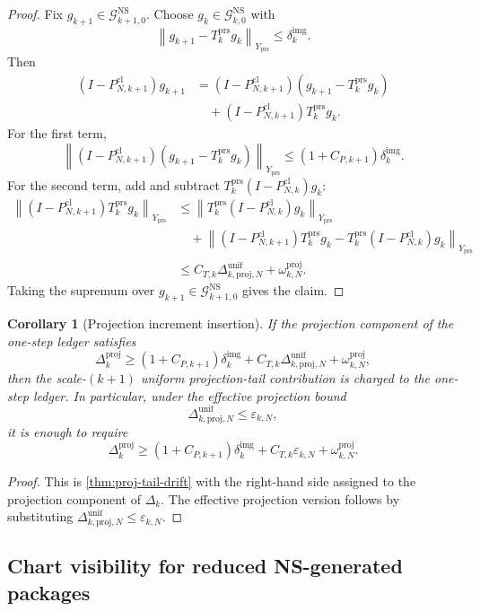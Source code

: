 \documentclass[11pt]{article}
\numberwithin{equation}{section}
\theoremstyle{plain}
\newtheorem{corollary}[theorem]{Corollary}
\theoremstyle{definition}
\theoremstyle{remark}
\newcommand{\NS}{\mathrm{NS}}
\newcommand{\cl}{\mathrm{cl}}
\newcommand{\prs}{\mathrm{prs}}
\newcommand{\proj}{\mathrm{proj}}
\newcommand{\norm}[1]{\left\lVert #1\right\rVert}
\begin{document}
\begin{proof}
Fix \(g_{k+1}\in\mathcal G_{k+1,0}^{\NS}\).  Choose
\(g_k\in\mathcal G_{k,0}^{\NS}\) with
\[
  \norm{g_{k+1}-T_k^{\prs}g_k}_{Y_{\prs}}
  \le
  \delta_k^{\mathrm{img}}.
\]
Then
\begin{align*}
  (I-P_{N,k+1}^{\cl})g_{k+1}
  &=
  (I-P_{N,k+1}^{\cl})(g_{k+1}-T_k^{\prs}g_k)\\
  &\quad
  +
  (I-P_{N,k+1}^{\cl})T_k^{\prs}g_k.
\end{align*}
For the first term,
\[
  \norm{(I-P_{N,k+1}^{\cl})(g_{k+1}-T_k^{\prs}g_k)}_{Y_{\prs}}
  \le
  (1+C_{P,k+1})\delta_k^{\mathrm{img}}.
\]
For the second term, add and subtract
\(T_k^{\prs}(I-P_{N,k}^{\cl})g_k\):
\begin{align*}
  \norm{(I-P_{N,k+1}^{\cl})T_k^{\prs}g_k}_{Y_{\prs}}
  &\le
  \norm{T_k^{\prs}(I-P_{N,k}^{\cl})g_k}_{Y_{\prs}}\\
  &\quad+
  \norm{
  (I-P_{N,k+1}^{\cl})T_k^{\prs}g_k
  -
  T_k^{\prs}(I-P_{N,k}^{\cl})g_k
  }_{Y_{\prs}}\\
  &\le
  C_{T,k}\Delta_{k,\proj,N}^{\mathrm{unif}}
  +
  \omega_{k,N}^{\proj}.
\end{align*}
Taking the supremum over \(g_{k+1}\in\mathcal G_{k+1,0}^{\NS}\) gives the
claim.
\end{proof}

\begin{corollary}[Projection increment insertion]\label{cor:proj-drift-insertion}
If the projection component of the one-step ledger satisfies
\[
  \Delta_k^{\proj}
  \ge
  (1+C_{P,k+1})\delta_k^{\mathrm{img}}
  +
  C_{T,k}\Delta_{k,\proj,N}^{\mathrm{unif}}
  +
  \omega_{k,N}^{\proj},
\]
then the scale-\((k+1)\) uniform projection-tail contribution is charged to
the one-step ledger.  In particular, under the effective projection bound
\[
  \Delta_{k,\proj,N}^{\mathrm{unif}}\le\varepsilon_{k,N},
\]
it is enough to require
\[
  \Delta_k^{\proj}
  \ge
  (1+C_{P,k+1})\delta_k^{\mathrm{img}}
  +
  C_{T,k}\varepsilon_{k,N}
  +
  \omega_{k,N}^{\proj}.
\]
\end{corollary}

\begin{proof}
This is \cref{thm:proj-tail-drift} with the right-hand side assigned to the
projection component of \(\Delta_k\).  The effective projection version
follows by substituting
\(\Delta_{k,\proj,N}^{\mathrm{unif}}\le\varepsilon_{k,N}\).
\end{proof}

\subsection{Chart visibility for reduced NS-generated packages}
\end{document}
